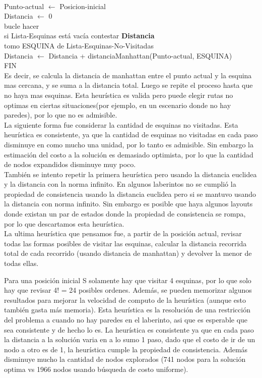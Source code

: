 \documentclass[12pt, titlepage, a4paper]{article}
\begin{document}
\ 

\noindent Punto-actual $\leftarrow$ Posicion-inicial\\
\noindent  Distancia $\leftarrow$ 0\\

\noindent bucle hacer\\
\indent si Lista-Esquinas está vacía contestar \textbf{Distancia}\\
\indent tomo ESQUINA de Lista-Esquinas-No-Visitadas\\
\indent Distancia $\leftarrow$ Distancia + distanciaManhattan(Punto-actual, ESQUINA)\\
\noindent FIN\\

Es decir, se calcula la distancia de manhattan entre el punto actual y la esquina
mas cercana, y se suma a la distancia total. Luego se repite el proceso hasta que no haya mas esquinas.
Esta heurística es valida pero puede elegir rutas no optimas en ciertas situaciones(por ejemplo, en un escenario
donde no hay paredes), por lo que no es admisible.\\

La siguiente forma fue considerar la cantidad de esquinas no visitadas. Esta heurística es consistente, ya que
la cantidad de esquinas no visitadas en cada paso disminuye en como mucho una unidad, por lo tanto es admisible.
Sin embargo la estimación del costo a la solución es demasiado optimista, por lo que la cantidad de nodos expandidos
disminuye muy poco.\\

También se intento repetir la primera heurística pero usando la distancia euclidea y la distancia con la norma
infinito. En algunos laberintos no se cumplió la propiedad de consistencia usando la distancia euclidea pero si
se mantuvo usando la distancia con norma infinito. Sin embargo es posible que haya algunos layouts donde existan
un par de estados donde la propiedad de consistencia se rompa, por lo que descartamos esta heurística.\\

La ultima heurística que pensamos fue, a partir de la posición actual, revisar todas las formas posibles
de visitar las esquinas, calcular la distancia recorrida total de cada recorrido (usando distancia de manhattan) y devolver la menor de todas
ellas.

Para una posición inicial S solamente hay que visitar 4 esquinas, por lo que solo hay que revisar 4! = 24 posibles
ordenes. Además, se pueden memorizar algunos resultados para mejorar la velocidad de computo de la heurística (aunque
esto también gasta más memoria). Esta heurística es la resolución de una restricción del problema a cuando no hay
paredes en el laberinto, asi que es esperable que sea consistente y de hecho lo es. La heurística es consistente ya que en cada paso la 
distancia a la solución varia en a lo sumo 1 paso, dado que el costo de ir de un nodo a otro es de 1, la heurística cumple la propiedad de
consistencia. Además disminuye mucho la cantidad de nodos explorados (741 nodos para la solución optima vs 1966 nodos
usando búsqueda de costo uniforme).
\end{document}
